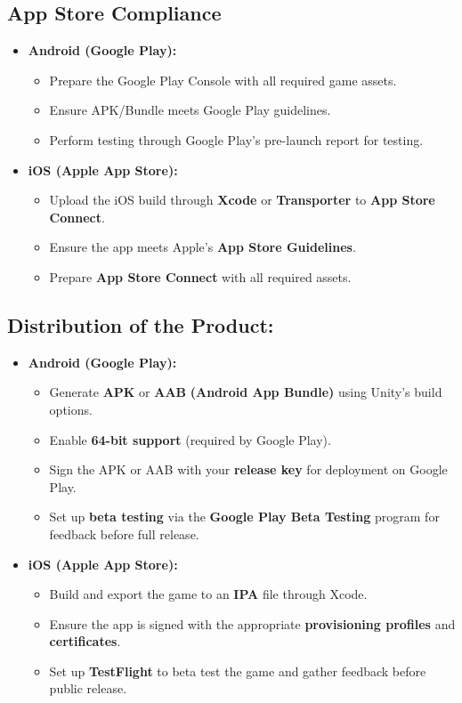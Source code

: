 	\subsection{App Store Compliance}
	\begin{itemize}
		\item \textbf{Android (Google Play):}
		\begin{itemize}
			\item {Prepare the Google Play Console with all required game assets.}
			\item {Ensure APK/Bundle meets Google Play guidelines.}
			\item {Perform testing through Google Play’s pre-launch report for testing.}
		\end{itemize}
		\item \textbf{iOS (Apple App Store):}
		\begin{itemize}
			\item {Upload the iOS build through \textbf{Xcode} or \textbf{Transporter} to \textbf{App Store Connect}.}
			\item {Ensure the app meets Apple’s \textbf{App Store Guidelines}.}
			\item {Prepare \textbf{App Store Connect} with all required assets.}
		\end{itemize}
	\end{itemize}
	\subsection{Distribution of the Product:}
	\begin{itemize}
		\item \textbf{Android (Google Play):}
		\begin{itemize}
			\item {Generate \textbf{APK} or \textbf{AAB} \textbf{(Android App Bundle)} using Unity's build options.}
			\item {Enable \textbf{64-bit support} (required by Google Play).}
			\item {Sign the APK or AAB with your \textbf{release key} for deployment on Google Play.}
			\item {Set up \textbf{beta testing} via the \textbf{Google Play Beta Testing} program for feedback before full release.}
		\end{itemize}
		\item \textbf{iOS (Apple App Store):}
		\begin{itemize}
			\item {Build and export the game to an \textbf{IPA} file through Xcode.}
			\item {Ensure the app is signed with the appropriate \textbf{provisioning profiles} and \textbf{certificates}.}
			\item {Set up \textbf{TestFlight} to beta test the game and gather feedback before public release.}
		\end{itemize}
	\end{itemize}
